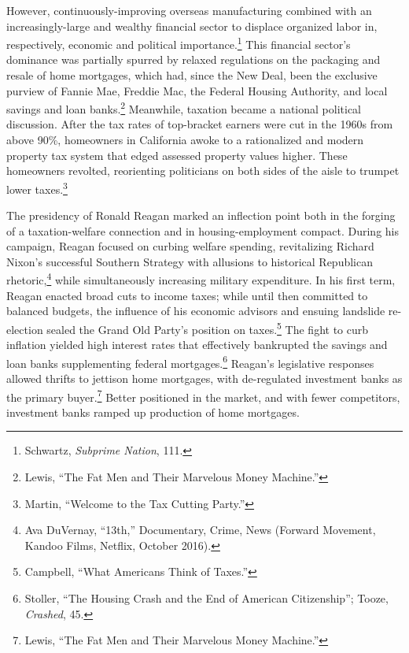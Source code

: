 \documentclass[12pt,oneside]{psthesis}
\begin{document}
However, continuously-improving overseas manufacturing combined with an increasingly-large and wealthy financial sector to displace organized labor in, respectively, economic and political importance.\footnote{Schwartz, \emph{Subprime Nation}, 111.}
This financial sector's dominance was partially spurred by relaxed regulations on the packaging and resale of home mortgages, which had, since the New Deal, been the exclusive purview of Fannie Mae, Freddie Mac, the Federal Housing Authority, and local savings and loan banks.\footnote{Lewis, ``The Fat Men and Their Marvelous Money Machine.''}
Meanwhile, taxation became a national political discussion.
After the tax rates of top-bracket earners were cut in the 1960s from above 90\%, homeowners in California awoke to a rationalized and modern property tax system that edged assessed property values higher.
These homeowners revolted, reorienting politicians on both sides of the aisle to trumpet lower taxes.\footnote{Martin, ``Welcome to the Tax Cutting Party.''}

The presidency of Ronald Reagan marked an inflection point both in the forging of a taxation-welfare connection and in housing-employment compact.
During his campaign, Reagan focused on curbing welfare spending, revitalizing Richard Nixon's successful Southern Strategy with allusions to historical Republican rhetoric,\footnote{Ava DuVernay, ``13th,'' Documentary, Crime, News (Forward Movement, Kandoo Films, Netflix, October 2016).} while simultaneously increasing military expenditure.
In his first term, Reagan enacted broad cuts to income taxes; while until then committed to balanced budgets, the influence of his economic advisors and ensuing landslide re-election sealed the Grand Old Party's position on taxes.\footnote{Campbell, ``What Americans Think of Taxes.''}
The fight to curb inflation yielded high interest rates that effectively bankrupted the savings and loan banks supplementing federal mortgages.\footnote{Stoller, ``The Housing Crash and the End of American Citizenship''; Tooze, \emph{Crashed}, 45.}
Reagan's legislative responses allowed thrifts to jettison home mortgages, with de-regulated investment banks as the primary buyer.\footnote{Lewis, ``The Fat Men and Their Marvelous Money Machine.''}
Better positioned in the market, and with fewer competitors, investment banks ramped up production of home mortgages.
\end{document}
